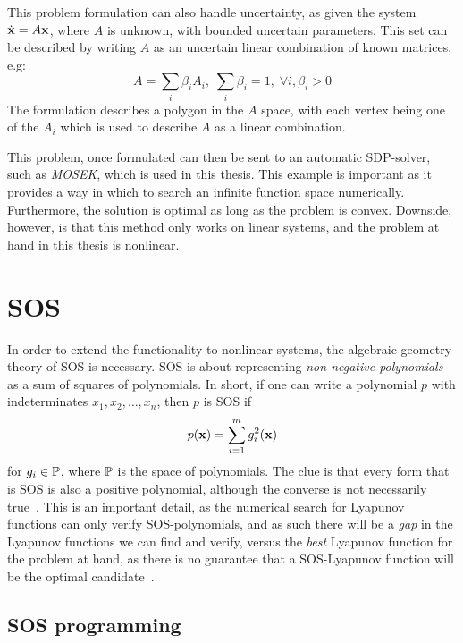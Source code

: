 This problem formulation can also handle uncertainty, as given the system
\(\dot{\vect{x}} = A\vect{x}\), where \(A\) is unknown, with bounded uncertain
parameters. This set can be described by writing \(A\) as an uncertain linear
combination of known matrices, e.g:
\[
  A = \sum_{i} \beta_{i}A_{i}, \; \sum_{i}\beta_{i} = 1, \; \forall i,\beta_{i}
  > 0
\]
The formulation describes a polygon in the \(A\) space, with each vertex being
one of the \(A_{i}\) which is used to describe \(A\) as a linear combination.

This problem, once formulated can then be sent to an automatic \ac{SDP}-solver,
such as \textit{MOSEK}\cite{mosek}, which is used in this thesis. This example
is important as it provides a way in which to search an infinite function space
numerically. Furthermore, the solution is optimal as long as the problem is
convex. Downside, however, is that this method only works on linear systems, and
the problem at hand in this thesis is nonlinear.

\section{SOS}

In order to extend the functionality to nonlinear systems, the algebraic
geometry theory of \ac{SOS} is necessary. \ac{SOS} is about representing
\textit{non-negative polynomials} as a sum of squares of polynomials. In short,
if one can write a polynomial \(p\) with indeterminates \(x_1,x_2,\ldots,x_n\),
then \(p\) is \ac{SOS} if
\[
  p(\vect{x}) = \sum_{i=1}^{m}g_i^2(\vect{x})
\]
for \(g_i \in \P\), where \(\P\) is the space of polynomials. The clue is that
every form that is \ac{SOS} is also a positive polynomial, although the converse
is not necessarily true~\cite{majumdarFunnelLibrariesRealtime2017}. This is an
important detail, as the numerical search for Lyapunov functions can only verify
\ac{SOS}-polynomials, and as such there will be a \textit{gap} in the Lyapunov
functions we can find and verify, versus the \textit{best} Lyapunov function for
the problem at hand, as there is no guarantee that a \ac{SOS}-Lyapunov function
will be the optimal candidate~\cite{parilloStructuredSemidefinitePrograms}.

\subsection{SOS programming}

